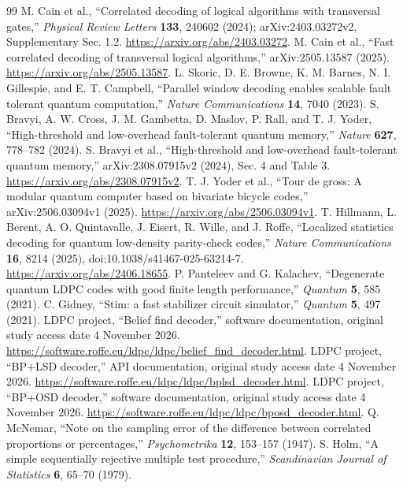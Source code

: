 \begin{thebibliography}{99}\small
{} M. Cain et al., ``Correlated decoding of logical algorithms with transversal gates,'' \emph{Physical Review Letters} \textbf{133}, 240602 (2024); arXiv:2403.03272v2, Supplementary Sec. 1.2. \url{https://arxiv.org/abs/2403.03272}.
 M. Cain et al., ``Fast correlated decoding of transversal logical algorithms,'' arXiv:2505.13587 (2025). \url{https://arxiv.org/abs/2505.13587}.
 L. Skoric, D. E. Browne, K. M. Barnes, N. I. Gillespie, and E. T. Campbell, ``Parallel window decoding enables scalable fault tolerant quantum computation,'' \emph{Nature Communications} \textbf{14}, 7040 (2023).
 S. Bravyi, A. W. Cross, J. M. Gambetta, D. Maslov, P. Rall, and T. J. Yoder, ``High-threshold and low-overhead fault-tolerant quantum memory,'' \emph{Nature} \textbf{627}, 778--782 (2024).
 S. Bravyi et al., ``High-threshold and low-overhead fault-tolerant quantum memory,'' arXiv:2308.07915v2 (2024), Sec. 4 and Table 3. \url{https://arxiv.org/abs/2308.07915v2}.
 T. J. Yoder et al., ``Tour de gross: A modular quantum computer based on bivariate bicycle codes,'' arXiv:2506.03094v1 (2025). \url{https://arxiv.org/abs/2506.03094v1}.
 T. Hillmann, L. Berent, A. O. Quintavalle, J. Eisert, R. Wille, and J. Roffe, ``Localized statistics decoding for quantum low-density parity-check codes,'' \emph{Nature Communications} \textbf{16}, 8214 (2025), doi:10.1038/s41467-025-63214-7. \url{https://arxiv.org/abs/2406.18655}.
 P. Panteleev and G. Kalachev, ``Degenerate quantum LDPC codes with good finite length performance,'' \emph{Quantum} \textbf{5}, 585 (2021).
 C. Gidney, ``Stim: a fast stabilizer circuit simulator,'' \emph{Quantum} \textbf{5}, 497 (2021).
 LDPC project, ``Belief find decoder,'' software documentation, original study access date 4 November 2026. \url{https://software.roffe.eu/ldpc/ldpc/belief_find_decoder.html}.
 LDPC project, ``BP+LSD decoder,'' API documentation, original study access date 4 November 2026. \url{https://software.roffe.eu/ldpc/ldpc/bplsd_decoder.html}.
 LDPC project, ``BP+OSD decoder,'' software documentation, original study access date 4 November 2026. \url{https://software.roffe.eu/ldpc/ldpc/bposd_decoder.html}.
 Q. McNemar, ``Note on the sampling error of the difference between correlated proportions or percentages,'' \emph{Psychometrika} \textbf{12}, 153--157 (1947).
 S. Holm, ``A simple sequentially rejective multiple test procedure,'' \emph{Scandinavian Journal of Statistics} \textbf{6}, 65--70 (1979).

\end{thebibliography}
